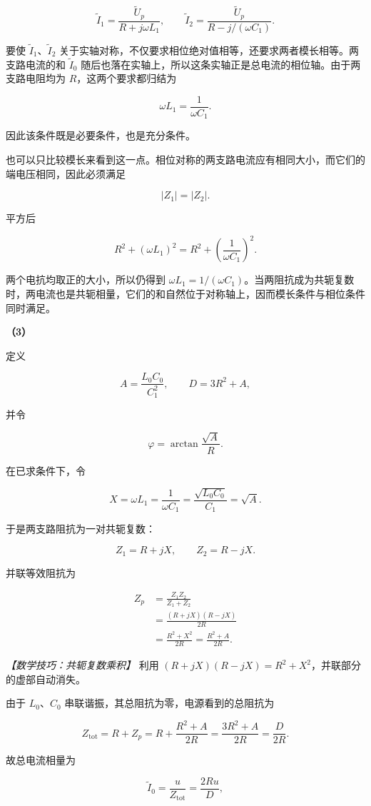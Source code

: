 \documentclass[12pt,a4paper,UTF8]{ctexart}
\begin{document}
\[\widetilde I_1=\frac{\widetilde U_p}{R+j\omega L_1},\qquad
\widetilde I_2=\frac{\widetilde U_p}{R-j/(\omega C_1)}.\]

要使 \(\widetilde I_1\)、\(\widetilde I_2\)
关于实轴对称，不仅要求相位绝对值相等，还要求两者模长相等。两支路电流的和
\(\widetilde I_0\)
随后也落在实轴上，所以这条实轴正是总电流的相位轴。由于两支路电阻均为
\(R\)，这两个要求都归结为

\[\omega L_1=\frac1{\omega C_1}.\]

因此该条件既是必要条件，也是充分条件。

也可以只比较模长来看到这一点。相位对称的两支路电流应有相同大小，而它们的端电压相同，因此必须满足

\[|Z_1|=|Z_2|.\]

平方后

\[R^2+(\omega L_1)^2
=R^2+\left(\frac1{\omega C_1}\right)^2.\]

两个电抗均取正的大小，所以仍得到
\(\omega L_1=1/(\omega C_1)\)。当两阻抗成为共轭复数时，两电流也是共轭相量，它们的和自然位于对称轴上，因而模长条件与相位条件同时满足。

\textbf{（3）}

定义

\[A=\frac{L_0C_0}{C_1^2},\qquad D=3R^2+A,\]

并令

\[\varphi=\arctan\frac{\sqrt A}{R}.\]

在已求条件下，令

\[X=\omega L_1=\frac1{\omega C_1}
=\frac{\sqrt{L_0C_0}}{C_1}=\sqrt A.\]

于是两支路阻抗为一对共轭复数：

\[Z_1=R+jX,\qquad Z_2=R-jX.\]

并联等效阻抗为

\[\begin{aligned}
Z_p&=\frac{Z_1Z_2}{Z_1+Z_2}\\
&=\frac{(R+jX)(R-jX)}{2R}\\
&=\frac{R^2+X^2}{2R}
=\frac{R^2+A}{2R}.
\end{aligned}\]

\emph{【数学技巧：共轭复数乘积】} 利用
\((R+jX)(R-jX)=R^2+X^2\)，并联部分的虚部自动消失。

由于 \(L_0\)、\(C_0\) 串联谐振，其总阻抗为零，电源看到的总阻抗为

\[Z_{\mathrm{tot}}
=R+Z_p
=R+\frac{R^2+A}{2R}
=\frac{3R^2+A}{2R}
=\frac D{2R}.\]

故总电流相量为

\[\widetilde I_0=\frac{u}{Z_{\mathrm{tot}}}
=\frac{2Ru}{D},\]
\end{document}
